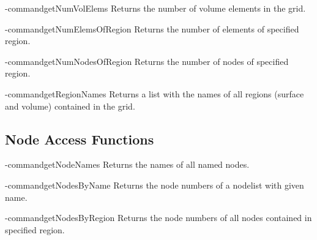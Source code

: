 \tcl-command{getNumVolElems}
Returns the number of volume elements in the grid.
\begin{tcl-params}
  \returnlist
\end{tcl-params}

\tcl-command{getNumElemsOfRegion}
Returns the number of elements of specified region.
\begin{tcl-params}
  \paramlist
  \returnlist
\end{tcl-params}

\tcl-command{getNumNodesOfRegion}
Returns the number of nodes of specified region.
\begin{tcl-params}
  \paramlist
  \returnlist
\end{tcl-params}

\tcl-command{getRegionNames}
Returns a list with the names of all regions (surface and volume)
contained in the grid.
\begin{tcl-params}
  \returnlist
\end{tcl-params}

\subsection{Node Access Functions}

\tcl-command{getNodeNames}
Returns the names of all named nodes.
\begin{tcl-params}
  \returnlist
\end{tcl-params}

\tcl-command{getNodesByName}
Returns the node numbers of a nodelist with given name.
\begin{tcl-params}
  \paramlist
  \returnlist
\end{tcl-params}

\tcl-command{getNodesByRegion}
Returns the node numbers of all nodes contained in specified region.
\begin{tcl-params}
  \paramlist
  \returnlist
\end{tcl-params}

